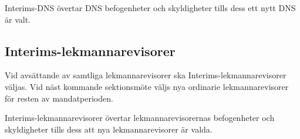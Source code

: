 Interims-DNS övertar DNS befogenheter och skyldigheter tills dess ett nytt DNS är valt.
\subsection{Interims-lekmannarevisorer}
Vid avsättande av samtliga lekmannarevisorer ska Interims-lekmannarevisorer väljas.
Vid näst kommande sektionsmöte väljs nya ordinarie lekmannarevisorer för resten av mandatperioden.

Interims-lekmannarevisorer övertar lekmannarevisorernas befogenheter och skyldigheter tills dess att nya lekmannarevisorer är valda.

